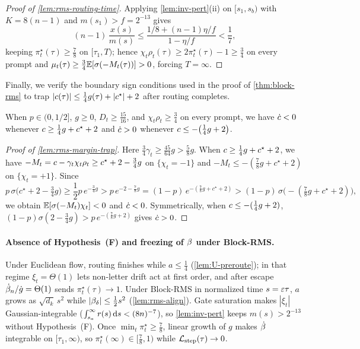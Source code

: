 \begin{proof}[Proof of \cref{lem:rms-routing-time}]
Applying \cref{lem:inv-pert}(ii) on $[s_1, s_b)$ with $K = 8(n-1)$ and $m(s_1) > f = 2^{-13}$ gives
\[
  (n-1)\,\frac{x(s)}{m(s)} \le \frac{1/8 + (n-1)\eta/f}{1 - \eta/f} < \frac{1}{7},
\]
keeping $\pi_t^\star(\tau) \ge \frac{7}{8}$ on $[\tau_1, T)$; hence $\chi_t\rho_t(\tau) \ge 2\pi_t^\star(\tau) - 1 \ge \frac{3}{4}$ on every prompt and $\mu_t(\tau) \ge \frac{3}{4}\mathbb E[\sigma(-M_t(\tau))] > 0$, forcing $T = \infty$.
\end{proof}

Finally, we verify the boundary sign conditions used in the proof of \cref{thm:block-rms} to trap $|c(\tau)| \le \frac{1}{4}g(\tau) + |c^\star| + 2$ after routing completes.

\begin{lemma}
\label{lem:rms-margin-trap}
When $p \in (0, 1/2]$, $g \ge 0$, $D_t \ge \frac{15}{16}$, and $\chi_t\rho_t \ge \frac{3}{4}$ on every prompt, we have $\dot{c} < 0$ whenever $c \ge \frac{1}{4}g + c^\star + 2$ and $\dot{c} > 0$ whenever $c \le -\bigl(\frac{1}{4}g + 2\bigr)$.
\end{lemma}
\begin{proof}[Proof of \cref{lem:rms-margin-trap}]
Here $\frac{3}{4}\gamma_t \ge \frac{45}{64}g > \frac{5}{8}g$. When $c \ge \frac{1}{4}g + c^\star + 2$, we have $-M_t = c - \gamma_t\chi_t\rho_t \ge c^\star + 2 - \frac{3}{4}g$ on $\{\chi_t = -1\}$ and $-M_t \le -(\frac{7}{8}g + c^\star + 2)$ on $\{\chi_t = +1\}$. Since
\[
  p\,\sigma\bigl(c^\star + 2 - \tfrac{3}{4}g\bigr)
  \ge \frac{1}{2}p\,e^{-\frac{3}{4}g}
  > p\,e^{-2 - \frac{7}{8}g}
  = (1-p)\,e^{-(\frac{7}{8}g + c^\star + 2)}
  > (1-p)\,\sigma\bigl(-(\tfrac{7}{8}g + c^\star + 2)\bigr),
\]
we obtain $\mathbb E[\sigma(-M_t)\chi_t] < 0$ and $\dot{c} < 0$. Symmetrically, when $c \le -(\frac{1}{4}g + 2)$, $(1-p)\sigma(2 - \frac{3}{4}g) > p\,e^{-(\frac{7}{8}g + 2)}$ gives $\dot{c} > 0$.
\end{proof}

\paragraph{Absence of Hypothesis~(F) and freezing of $\beta$ under Block-RMS.}
Under Euclidean flow, routing finishes while $a \le \frac{1}{4}$ (\cref{lem:U-preroute}); in that regime $\xi_t = \Theta(1)$ lets non-letter drift act at first order, and after escape $\dot{\beta}_n / \dot g = \Theta(1)$ sends $\pi_t^\star(\tau) \to 1$. Under Block-RMS in normalized time $s = \varepsilon\tau$, $a$ grows as $\sqrt{d_k}\,s^2$ while $|\beta_\delta| \le \frac{1}{2}s^2$ (\cref{lem:rms-align}). Gate saturation makes $|\xi_t|$ Gaussian-integrable ($\int_{s_a}^\infty r(s)\,\mathrm{d} s < (8n)^{-7}$), so \cref{lem:inv-pert} keeps $m(s) > 2^{-13}$ without Hypothesis~(F). Once $\min_t\pi_t^\star \ge \frac{7}{8}$, linear growth of $g$ makes $\dot{\beta}$ integrable on $[\tau_1, \infty)$, so $\pi_t^\star(\infty) \in [\frac{7}{8}, 1)$ while $\mathcal L_{\mathrm{step}}(\tau) \to 0$.

